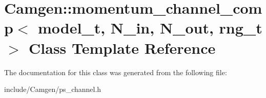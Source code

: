 \hypertarget{a00375}{}\section{Camgen\+:\+:momentum\+\_\+channel\+\_\+comp$<$ model\+\_\+t, N\+\_\+in, N\+\_\+out, rng\+\_\+t $>$ Class Template Reference}
\label{a00375}


The documentation for this class was generated from the following file\+:\begin{DoxyCompactItemize}
\item 
include/\+Camgen/ps\+\_\+channel.\+h\end{DoxyCompactItemize}
